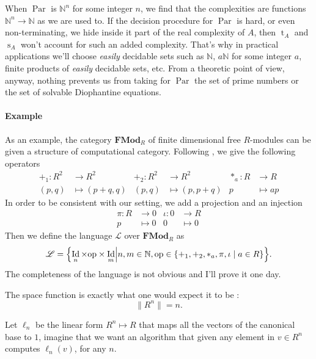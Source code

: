 \documentclass{article}
\newcommand{\cat}[1]{\mathscr{#1}}
\newcommand{\lcat}[1]{\mathbf{#1}}
\renewcommand{\L}{\cat{L}}
\newcommand{\size}[1]{\lVert#1\rVert}
\DeclareMathOperator{\Id}{Id}
\newcommand{\N}{\mathbb{N}}
\newcommand{\ra}{\rightarrow}
\DeclareMathOperator{\Time}{t}
\DeclareMathOperator{\Space}{s}
\DeclareMathOperator{\Par}{Par}
\begin{document}
  When $\Par$ is $\N^n$ for some integer $n$, we find that the
  complexities are functions $\N^n\ra\N$ as we are used to. If the
  decision procedure for $\Par$ is hard, or even non-terminating, we
  hide inside it part of the real complexity of $A$, then $\Time_A$
  and $\Space_A$ won't account for such an added complexity. That's
  why in practical applications we'll choose \emph{easily} decidable
  sets such as $\N$, $a\N$ for some integer $a$, finite products of
  \emph{easily} decidable sets, etc. From a theoretic point of view,
  anyway, nothing prevents us from taking for $\Par$ the set of prime
  numbers or the set of solvable Diophantine equations.

  \paragraph{Example}
  As an example, the category $\lcat{FMod}_R$ of finite dimensional
  free $R$-modules can be given a structure of computational
  category. Following \cite{BLS03}, we give the following operators
  \begin{align*}
    +_1 : R^2 &\ra R^2         &   +_2 : R^2&\ra R^2       &  *_a : R&\ra R\\
         (p,q)&\mapsto(p+q,q)  &      (p,q)&\mapsto(p,p+q) &       p&\mapsto ap
  \end{align*}
  In order to be consistent with our setting, we add a projection and
  an injection
  \begin{align*}
    \pi : R&\ra 0     &  \iota : 0&\ra R   \\
          p&\mapsto0  &          0&\mapsto0
  \end{align*}
  Then we define the language $\L$ over $\lcat{FMod}_R$ as 
  \begin{equation}
    \label{eq:linlang}
    \L = \Bigl\{\Id_n\times\mathrm{op}\times\Id_m \Bigl\lvert
    n,m\in\N, \mathrm{op}\in\{+_1,+_2,*_a,\pi,\iota\;|\;a\in R\} \Bigr\}
    \text{.}
  \end{equation}
  The completeness of the language is not obvious and I'll prove it
  one day.

  The space function is exactly what one would expect it to be :
  \begin{equation}
    \size{R^n} = n \text{.}
  \end{equation}
  
  Let $\ell_n$ be the linear form $R^n\mapsto R$ that maps all the
  vectors of the canonical base to $1$, imagine that we want an
  algorithm that given any element in $v\in R^n$ computes $\ell_n(v)$,
  for any $n$.
\end{document}
